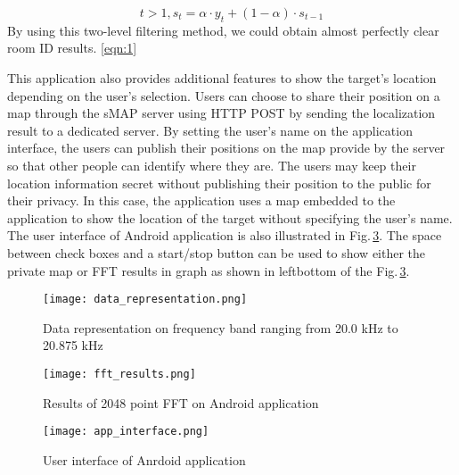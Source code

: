\begin{equation}
t>1, s_t=\alpha \cdot y_t+(1-\alpha)\cdot s_{t-1}
\label{eqn:1}
\end{equation}
By using this two-level filtering method, we could obtain almost perfectly clear room ID results.
\ref{eqn:1}

This application also provides additional features to show the target's location depending on the user's selection. Users can choose to share their position on a map through the sMAP server using HTTP POST by sending the localization result to a dedicated server. By setting the user's name on the application interface, the users can publish their positions on the map provide by the server so that other people can identify where they are. The users may keep their location information secret without publishing their position to the public for their privacy. In this case, the application uses a map embedded to the application to show the location of the target without specifying the user's name. The user interface of Android application is also illustrated in Fig.\,\ref{fig:app_interface}. The space between check boxes and a start/stop button can be used to show either the private map or FFT results in graph as shown in leftbottom of the Fig.\,\ref{fig:app_interface}.

\begin{figure}
  \centering
  \texttt{[image: data\_representation.png]}
  \caption{Data representation on frequency band ranging from 20.0 kHz to 20.875 kHz}
  \label{fig:data_representation}
\end{figure}

\begin{figure}
  \centering
  \texttt{[image: fft\_results.png]}
  \caption{Results of 2048 point FFT on Android application}
  \label{fig:fft_results}
\end{figure}

\begin{figure}
  \centering
  \texttt{[image: app\_interface.png]}
  \caption{User interface of Anrdoid application}
  \label{fig:app_interface}
\end{figure}

